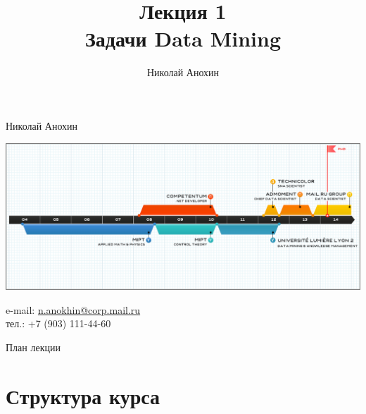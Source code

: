 \documentclass[10pt]{beamer}
\author{Николай Анохин}
\title{\newline \newline \newline Лекция 1 \\ Задачи Data Mining}
\let\otp\titlepage
\renewcommand{\titlepage}{\otp\addtocounter{framenumber}{-1}}
\begin{document}
\begin{frame}[plain]
\titlepage
\end{frame}

\begin{frame}{Николай Анохин}

\begin{center}
\includegraphics[scale=0.325]{images/timeline.png}
\end{center}

\begin{footnotesize}
e-mail: \href{mailto:n.anokhin@corp.mail.ru}{n.anokhin@corp.mail.ru} \\
тел.: +7 (903) 111-44-60
\end{footnotesize}

\end{frame}

\begin{frame}{План лекции}
\tableofcontents
\end{frame}

\section{Структура курса}
\end{document}
